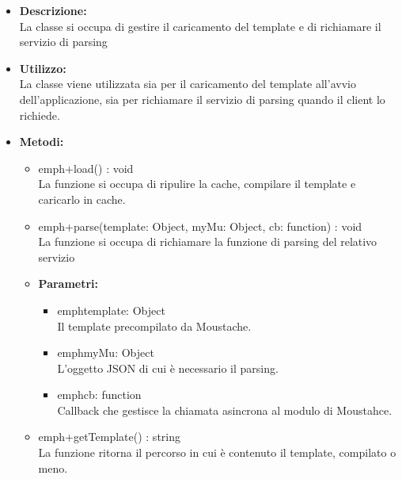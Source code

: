         \begin{itemize}
          \item \textbf{Descrizione: }\\
          La classe si occupa di gestire il caricamento del template e di richiamare il servizio di parsing
          \item \textbf{Utilizzo: }\\
          La classe viene utilizzata sia per il caricamento del template all'avvio dell'applicazione, sia per richiamare il servizio di parsing quando il client lo richiede.
          \item \textbf{Metodi: }\\
          \begin{itemize}
            \item emph{+load() : void}\\
            La funzione si occupa di ripulire la cache, compilare il template e caricarlo in cache.
            \item emph{+parse(template: Object, myMu: Object, cb: function) : void}\\
            La funzione si occupa di richiamare la funzione di parsing del relativo servizio
            \item \textbf{Parametri: }\\
            \begin{itemize}
              \item emph{template: Object}\\
              Il template precompilato da Moustache.
              \item emph{myMu: Object}\\
              L'oggetto JSON di cui è necessario il parsing.
              \item emph{cb: function}\\
              Callback che gestisce la chiamata asincrona al modulo di Moustahce.
            \end{itemize}
            \item emph{+getTemplate() : string}\\
            La funzione ritorna il percorso in cui è contenuto il template, compilato o meno.
          \end{itemize}
        \end{itemize}
